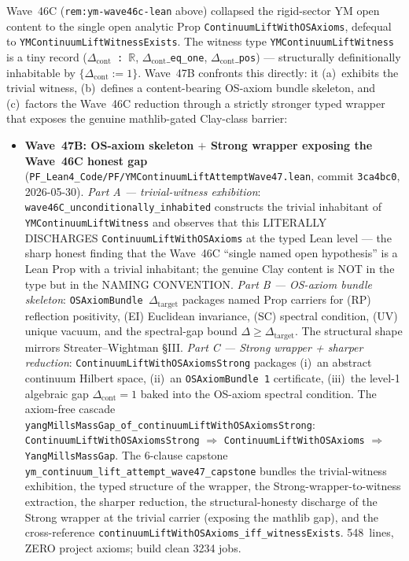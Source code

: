 \begin{remark}\label{rem:ym-wave47b-lean}
Wave~46C (\texttt{rem:ym-wave46c-lean} above) collapsed the rigid-sector YM open content to the single open analytic Prop \texttt{ContinuumLiftWithOSAxioms}, defequal to \texttt{YMContinuumLiftWitnessExists}. The witness type \texttt{YMContinuumLiftWitness} is a tiny record (\texttt{$\Delta_{\mathrm{cont}}$ : $\mathbb{R}$}, \texttt{$\Delta_{\mathrm{cont}}\_$eq\_one}, \texttt{$\Delta_{\mathrm{cont}}\_$pos}) --- structurally definitionally inhabitable by $\{\Delta_{\mathrm{cont}} := 1\}$. Wave~47B confronts this directly: it (a)~exhibits the trivial witness, (b)~defines a content-bearing OS-axiom bundle skeleton, and (c)~factors the Wave~46C reduction through a strictly stronger typed wrapper that exposes the genuine mathlib-gated Clay-class barrier:
\begin{itemize}
  \item \textbf{Wave~47B: OS-axiom skeleton $+$ Strong wrapper exposing the Wave~46C honest gap} (\texttt{PF\_Lean4\_Code/PF/YMContinuumLiftAttemptWave47.lean}, commit \texttt{3ca4bc0}, 2026-05-30). \emph{Part A --- trivial-witness exhibition}: \texttt{wave46C\_unconditionally\_inhabited} constructs the trivial inhabitant of \texttt{YMContinuumLiftWitness} and observes that this LITERALLY DISCHARGES \texttt{ContinuumLiftWithOSAxioms} at the typed Lean level --- the sharp honest finding that the Wave~46C ``single named open hypothesis'' is a Lean Prop with a trivial inhabitant; the genuine Clay content is NOT in the type but in the NAMING CONVENTION. \emph{Part B --- OS-axiom bundle skeleton}: \texttt{OSAxiomBundle $\Delta_{\mathrm{target}}$} packages named Prop carriers for (RP) reflection positivity, (EI) Euclidean invariance, (SC) spectral condition, (UV) unique vacuum, and the spectral-gap bound $\Delta \geq \Delta_{\mathrm{target}}$. The structural shape mirrors Streater--Wightman \S III. \emph{Part C --- Strong wrapper + sharper reduction}: \texttt{ContinuumLiftWithOSAxiomsStrong} packages (i)~an abstract continuum Hilbert space, (ii)~an \texttt{OSAxiomBundle 1} certificate, (iii)~the level-1 algebraic gap $\Delta_{\mathrm{cont}} = 1$ baked into the OS-axiom spectral condition. The axiom-free cascade \texttt{yangMillsMassGap\_of\_continuumLiftWithOSAxiomsStrong}: \texttt{ContinuumLiftWithOSAxiomsStrong} $\Rightarrow$ \texttt{ContinuumLiftWithOSAxioms} $\Rightarrow$ \texttt{YangMillsMassGap}. The 6-clause capstone \texttt{ym\_continuum\_lift\_attempt\_wave47\_capstone} bundles the trivial-witness exhibition, the typed structure of the wrapper, the Strong-wrapper-to-witness extraction, the sharper reduction, the structural-honesty discharge of the Strong wrapper at the trivial carrier (exposing the mathlib gap), and the cross-reference \texttt{continuumLiftWithOSAxioms\_iff\_witnessExists}. 548~lines, ZERO project axioms; build clean 3234 jobs.

\end{itemize}
\end{remark}
